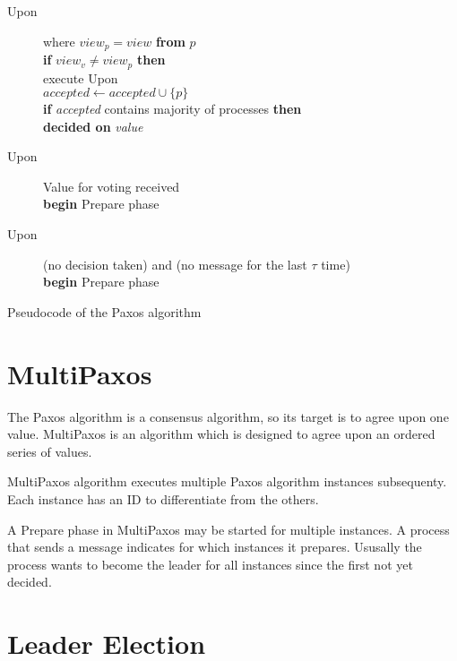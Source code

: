 \begin{table}
\begin{description}
 \vspace{-0.5em}
 \item[Upon]  where $\textit{view}_p = \textit{view}$ \textbf{from} $p$ \\
   \textbf{if} $\textit{view}_v \neq \textit{view}_p$ \textbf{then} \\
     \hspace*{\defaultParIndent} execute Upon  \\
   $\textit{accepted} \leftarrow \textit{accepted} \cup \{ p \} $ \\
   \textbf{if} \textit{accepted} contains majority of processes \textbf{then} \\
     \hspace*{\defaultParIndent} \textbf{decided on} \textit{value}

 \vspace{-0.5em}
 \item[Upon] Value for voting received \\
   \textbf{begin} Prepare phase

 \vspace{-0.5em}
 \item[Upon] (no decision taken) and (no message for the last $\tau$ time) \\
   \textbf{begin} Prepare phase

\end{description}
\caption{Pseudocode of the Paxos algorithm}
\label{table:paxosAlgorithm}
\end{table}

\section{MultiPaxos}

The Paxos algorithm is a consensus algorithm, so its target is to agree upon one value. MultiPaxos is an algorithm which is designed to agree upon an ordered series of values.

MultiPaxos algorithm executes multiple Paxos algorithm instances subsequenty. Each instance has an ID to differentiate from the others.

A Prepare phase in MultiPaxos may be started for multiple instances. A process that sends a \prepare message indicates for which instances it prepares. Ususally the process wants to become the leader for all instances since the first not yet decided.

\section{Leader Election}
\label{sec:leader_election}
\indent\par

